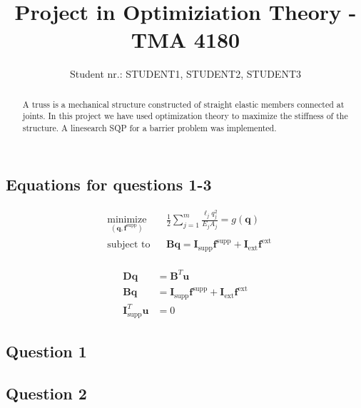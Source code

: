 \documentclass[10pt,a4paper]{article}
\begin{document}
\title{Project in Optimiziation Theory - TMA 4180}
\author{Student nr.: STUDENT1, STUDENT2, STUDENT3}
\maketitle

\begin{abstract}
A truss is a mechanical structure constructed of straight elastic members connected at joints. In this project we have used optimization theory to maximize the stiffness of the structure. A linesearch SQP for a barrier problem was implemented.
\end{abstract}

\subsection*{Equations for questions 1-3}

\begin{equation}
 \begin{aligned}
 \label{eq:system5}
 & \underset{(\bm{q},\bm{f}^{\textrm{supp}})}{\text{minimize}}
 & & \frac{1}{2}\sum_{j=1}^{m}\frac{\ell_{j}q_{j}^{2}}{E_{j}A_{j}} = g(\bm{q}) \\
 & \text{subject to}
 & & \bm{Bq} = \bm{I}_{\textrm{supp}}\bm{f}^{\textrm{supp}} + \bm{I}_{\textrm{ext}}\bm{f}^{\textrm{ext}}
 \end{aligned}
\end{equation}
\\
\begin{equation}
\begin{aligned}
\label{eq:system4}
\bm{Dq} &= \bm{B}^{{T}}\bm{u}\\
\bm{Bq} &= \bm{I}_{\textrm{supp}}\bm{f}^{\textrm{supp}} + \bm{I}_{\textrm{ext}}\bm{f}^{\textrm{ext}}\\
\bm{I}_{\textrm{supp}}^{T}\bm{u} &= 0
\end{aligned}
\end{equation}


\subsection*{Question 1}



\subsection*{Question 2}

\end{document}
